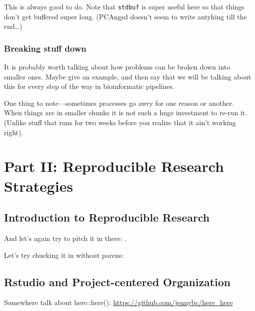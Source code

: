 \documentclass[]{krantz}
\begin{document}
This is always good to do. Note that \texttt{stdbuf} is super useful here so that
things don't get buffered super long. (PCAngsd doesn't seem to write antyhing till
the end\ldots{})

\hypertarget{breaking-stuff-down}{%
\section{Breaking stuff down}\label{breaking-stuff-down}}

It is probably worth talking about how problems can be broken down into
smaller ones. Maybe give an example, and then say that we will be talking about
this for every step of the way in bioinformatic pipelines.

One thing to note---sometimes processes go awry for one reason or another.
When things are in smaller chunks it is not such a huge investment to
re-run it. (Unlike stuff that runs for two weeks before you realize that
it ain't working right).

\hypertarget{part-part-ii-reproducible-research-strategies}{%
\part{Part II: Reproducible Research Strategies}\label{part-part-ii-reproducible-research-strategies}}

\hypertarget{introduction-to-reproducible-research}{%
\chapter{Introduction to Reproducible Research}\label{introduction-to-reproducible-research}}

\citep{PritchardInferencePopulationStructure2000}

And let's again try to pitch it in there: \citep{PritchardInferencePopulationStructure2000}.

Let's try chucking it in without parens: \citet{PritchardInferencePopulationStructure2000}

\hypertarget{rstudio-and-project-centered-organization}{%
\chapter{Rstudio and Project-centered Organization}\label{rstudio-and-project-centered-organization}}

Somewhere talk about here::here(): \url{https://github.com/jennybc/here_here}
\end{document}
